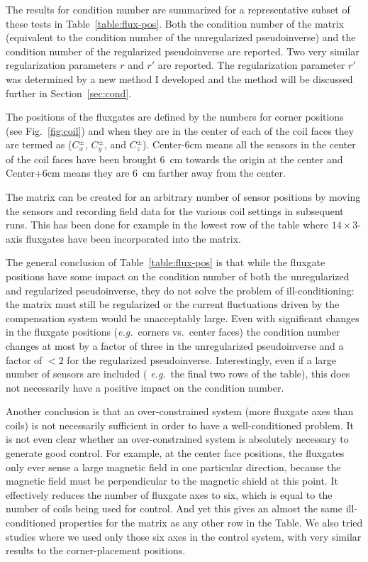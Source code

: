 The results for condition number are summarized for a representative
subset of these tests in Table~\ref{table:flux-pos}.  Both the
condition number of the matrix (equivalent to the condition number of
the unregularized pseudoinverse) and the condition number of the
regularized pseudoinverse are reported.  Two very similar
regularization parameters $r$ and $r'$ are reported.  The
regularization parameter $r'$ was determined by a new method I
developed and the method will be discussed further in
Section~\ref{sec:cond}.

The positions of the fluxgates are defined by the numbers for corner
positions (see Fig.~\ref{fig:coil}) and when they are in the center of
each of the coil faces they are termed as ($C_x^\pm$, $C_y^\pm$, and
$C_z^\pm$). Center-6cm means all the sensors in the center of the coil
faces have been brought 6~cm towards the origin at the center and
Center+6cm means they are 6~cm farther away from the center.

The matrix can be created for an arbitrary number of sensor positions
by moving the sensors and recording field data for the various coil
settings in subsequent runs.  This has been done for example in the
lowest row of the table where $14\times 3$-axis fluxgates have been
incorporated into the matrix.

The general conclusion of Table~\ref{table:flux-pos} is that while the
fluxgate positions have some impact on the condition number of both
the unregularized and regularized pseudoinverse, they do not solve the
problem of ill-conditioning: the matrix must still be regularized or
the current fluctuations driven by the compensation system would be
unacceptably large.  Even with significant changes in the fluxgate
positions ({\it e.g.}~corners vs.~center faces) the condition number
changes at most by a factor of three in the unregularized
pseudoinverse and a factor of $<2$ for the regularized pseudoinverse.
Interestingly, even if a large number of sensors are included ({\it
e.g.}~the final two rows of the table), this does not necessarily have
a positive impact on the condition number.

Another conclusion is that an over-constrained system (more fluxgate
axes than coils) is not necessarily sufficient in order to have a
well-conditioned problem.  It is not even clear whether an
over-constrained system is absolutely necessary to generate good
control.  For example, at the center face positions, the fluxgates
only ever sense a large magnetic field in one particular direction,
because the magnetic field must be perpendicular to the magnetic
shield at this point.  It effectively reduces the number of fluxgate
axes to six, which is equal to the number of coils being used for
control.  And yet this gives an almost the same ill-conditioned
properties for the matrix as any other row in the Table.  We also
tried studies where we used only those six axes in the control system,
with very similar results to the corner-placement positions.

